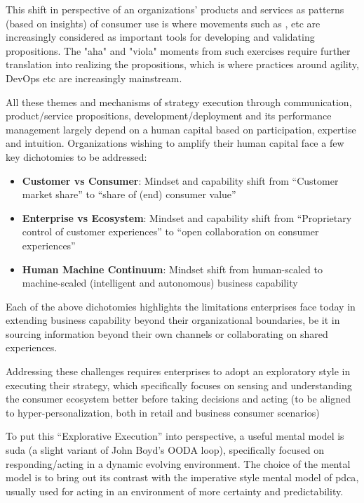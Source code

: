 This shift in perspective of an organizations’ products and services as patterns (based on insights) of consumer use
is where movements such as ,  etc are increasingly considered
as important tools for developing and validating propositions.
The "aha" and "viola" moments from such exercises require further translation into realizing the propositions,
which is where practices around agility, DevOps etc are increasingly mainstream.

All these themes and mechanisms of strategy execution through communication, product/service propositions,
development/deployment and its performance management
largely depend on a human capital based on participation, expertise and intuition.
Organizations wishing to amplify their human capital face a few key dichotomies to be addressed:

\begin{itemize}
    \item \textbf{Customer vs Consumer}: Mindset and capability shift from ``Customer market share'' to
          ``share of (end) consumer value''
    \item \textbf{Enterprise vs Ecosystem}: Mindset and capability shift from
          “Proprietary control of customer experiences” to “open collaboration on consumer experiences”
    \item \textbf{Human Machine Continuum}: Mindset shift from human-scaled to machine-scaled
          (intelligent and autonomous) business capability
\end{itemize}
Each of the above dichotomies highlights the limitations enterprises face today in extending business capability
beyond their organizational boundaries, be it in sourcing information beyond their own channels or collaborating
on shared experiences.

Addressing these challenges requires enterprises to adopt an exploratory style in executing their strategy,
which specifically focuses on sensing and understanding the consumer ecosystem better before taking decisions
and acting (to be aligned to hyper-personalization, both in retail and business consumer scenarios)

To put this “Explorative Execution” into perspective, a useful mental model is \gls{suda}
(a slight variant of John Boyd’s OODA loop),
specifically focused on responding/acting in a dynamic evolving environment.
The choice of the mental model is to bring out its contrast with the imperative style mental model of \gls{pdca},
usually used for acting in an environment of more certainty and predictability.

